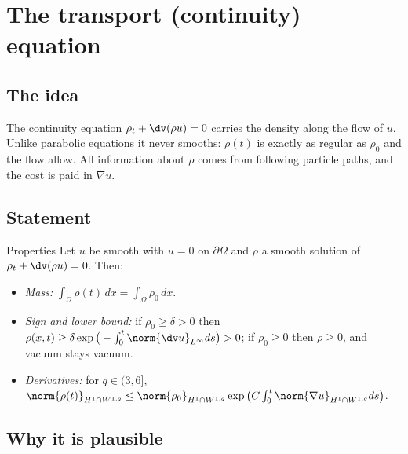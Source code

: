 
\section{The transport (continuity) equation}\label{p:transport-equation}


\subsection*{The idea}

The continuity equation $\rho_t+\dv(\rho u)=0$ carries the density along the flow of $u$. Unlike parabolic equations it never smooths: $\rho(t)$ is exactly as regular as $\rho_0$ and the flow allow. All information about $\rho$ comes from following particle paths, and the cost is paid in $\nabla u$.

\subsection*{Statement}

\begin{thmbox}{Properties}
Let $u$ be smooth with $u=0$ on $\partial\Omega$ and $\rho$ a smooth solution of $\rho_t+\dv(\rho u)=0$. Then:

\begin{itemize}
\item \emph{Mass:} $\int_\Omega\rho(t)\,dx=\int_\Omega\rho_0\,dx$.
\item \emph{Sign and lower bound:} if $\rho_0\ge\delta> 0$ then $\rho(x,t)\ge\delta\exp\big(-\int_0^t\norm{\dv u}_{L^\infty}ds\big)> 0$; if $\rho_0\ge0$ then $\rho\ge0$, and vacuum stays vacuum.
\item \emph{Derivatives:} for $q\in(3,6]$, $\norm{\rho(t)}_{H^1\cap W^{1,q}}\le\norm{\rho_0}_{H^1\cap W^{1,q}}\exp\big(C\int_0^t\norm{\nabla u}_{H^1\cap W^{1,q}}ds\big)$.
\end{itemize}
\end{thmbox}

\subsection*{Why it is plausible}

